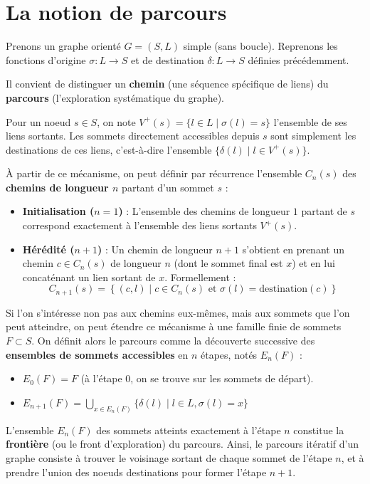 \documentclass[11pt,a4paper]{report}
\begin{document}
	
	\section{La notion de parcours}
	
	Prenons un graphe orienté $G = (S,L)$ simple (sans boucle). Reprenons les fonctions d'origine $\sigma : L \rightarrow S$ et de destination $\delta : L \rightarrow S$ définies précédemment. 
	
	Il convient de distinguer un \textbf{chemin} (une séquence spécifique de liens) du \textbf{parcours} (l'exploration systématique du graphe). 
	
	Pour un noeud $s \in S$, on note $V^+(s) = \{ l \in L \mid \sigma(l) = s \}$ l'ensemble de ses liens sortants. Les sommets directement accessibles depuis $s$ sont simplement les destinations de ces liens, c'est-à-dire l'ensemble $\{ \delta(l) \mid l \in V^+(s) \}$. 
	
	À partir de ce mécanisme, on peut définir par récurrence l'ensemble $C_n(s)$ des \textbf{chemins de longueur $n$} partant d'un sommet $s$ :
	\begin{itemize}
		\item \textbf{Initialisation ($n=1$)} : L'ensemble des chemins de longueur $1$ partant de $s$ correspond exactement à l'ensemble des liens sortants $V^+(s)$.
		\item \textbf{Hérédité ($n+1$)} : Un chemin de longueur $n+1$ s'obtient en prenant un chemin $c \in C_n(s)$ de longueur $n$ (dont le sommet final est $x$) et en lui concaténant un lien sortant de $x$. Formellement : 
		$$C_{n+1}(s) = \left\{ (c, l) \mid c \in C_n(s) \text{ et } \sigma(l) = \text{destination}(c) \right\}$$
	\end{itemize}
	
	Si l'on s'intéresse non pas aux chemins eux-mêmes, mais aux sommets que l'on peut atteindre, on peut étendre ce mécanisme à une famille finie de sommets $F \subset S$. On définit alors le parcours comme la découverte successive des \textbf{ensembles de sommets accessibles} en $n$ étapes, notés $E_n(F)$ :
	\begin{itemize}
		\item $E_0(F) = F$ (à l'étape 0, on se trouve sur les sommets de départ).
		\item $E_{n+1}(F) = \bigcup_{x \in E_n(F)} \{ \delta(l) \mid l \in L, \sigma(l) = x \}$
	\end{itemize}
	
	
	L'ensemble $E_n(F)$ des sommets atteints exactement à l'étape $n$ constitue la \textbf{frontière} (ou le front d'exploration) du parcours. Ainsi, le parcours itératif d'un graphe consiste à trouver le voisinage sortant de chaque sommet de l'étape $n$, et à prendre l'union des noeuds destinations pour former l'étape $n+1$.
	
\end{document}
